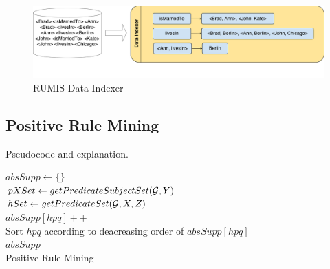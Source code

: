 \begin{figure}[ht]
\centering
\includegraphics[width=1.0\textwidth]{figures/data_indexing}
\caption{RUMIS Data Indexer}
\label{system_overview}
\end{figure}

\subsection{Positive Rule Mining}

Pseudocode and explanation.

\IncMargin{1.5em}
\begin{algorithm}[H]
\DontPrintSemicolon
\SetAlgoLined
{}
\BlankLine
$absSupp \leftarrow \{\}$\\
\BlankLine
{} {
    \BlankLine
	$pXSet \leftarrow getPredicateSubjectSet(\mathcal{G}, Y)$\\
	 {
		$hSet \leftarrow getPredicateSet(\mathcal{G}, X, Z)$\\
		$absSupp[hpq]++$\\
	}
}
\BlankLine
Sort $hpq$ according to deacreasing order of $absSupp[hpq]$\\
\Return $absSupp$\\
\caption{Positive Rule Mining}
\end{algorithm}
\DecMargin{1.5em}

% 
% 

